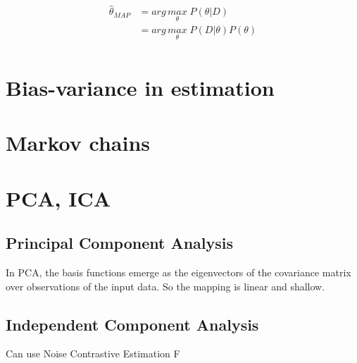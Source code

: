 \documentclass[../main.tex]{subfiles}
\begin{document}
\begin{align*}
    \hat{\theta}_{MAP} & = arg\,\underset{\theta}{max}\; P(\theta | D) \\
                       & = arg\,\underset{\theta}{max}\; P(D | \theta) P(\theta) \\
\end{align*}

\section{Bias-variance in estimation}
\section{Markov chains}
\section{PCA, ICA}
\subsection{Principal Component Analysis}
In PCA, the basis functions emerge as the eigenvectors of the covariance matrix over observations of
the input data. So the mapping is linear and shallow.

\subsection{Independent Component Analysis}
Can use Noise Contrastive Estimation
F
\end{document}
